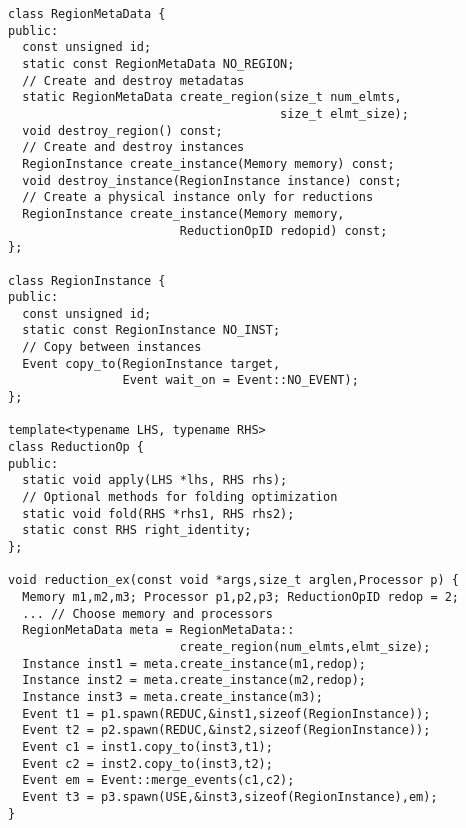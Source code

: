 \begin{lstlisting}[float={t},label={lst:regionapi},caption={Physical Region Interface and Example.}]
class RegionMetaData {
public:
  const unsigned id;
  static const RegionMetaData NO_REGION;
  // Create and destroy metadatas
  static RegionMetaData create_region(size_t num_elmts, 
                                      size_t elmt_size);
  void destroy_region() const;
  // Create and destroy instances
  RegionInstance create_instance(Memory memory) const;
  void destroy_instance(RegionInstance instance) const;
  // Create a physical instance only for reductions
  RegionInstance create_instance(Memory memory, 
                        ReductionOpID redopid) const;
};

class RegionInstance {
public:
  const unsigned id;
  static const RegionInstance NO_INST;
  // Copy between instances
  Event copy_to(RegionInstance target, 
                Event wait_on = Event::NO_EVENT);
};

template<typename LHS, typename RHS>
class ReductionOp {
public:
  static void apply(LHS *lhs, RHS rhs);
  // Optional methods for folding optimization
  static void fold(RHS *rhs1, RHS rhs2);
  static const RHS right_identity;
};

void reduction_ex(const void *args,size_t arglen,Processor p) {
  Memory m1,m2,m3; Processor p1,p2,p3; ReductionOpID redop = 2;
  ... // Choose memory and processors
  RegionMetaData meta = RegionMetaData::
                        create_region(num_elmts,elmt_size);
  Instance inst1 = meta.create_instance(m1,redop);
  Instance inst2 = meta.create_instance(m2,redop);
  Instance inst3 = meta.create_instance(m3);
  Event t1 = p1.spawn(REDUC,&inst1,sizeof(RegionInstance));
  Event t2 = p2.spawn(REDUC,&inst2,sizeof(RegionInstance));
  Event c1 = inst1.copy_to(inst3,t1);
  Event c2 = inst2.copy_to(inst3,t2);
  Event em = Event::merge_events(c1,c2);
  Event t3 = p3.spawn(USE,&inst3,sizeof(RegionInstance),em);
}
\end{lstlisting}

